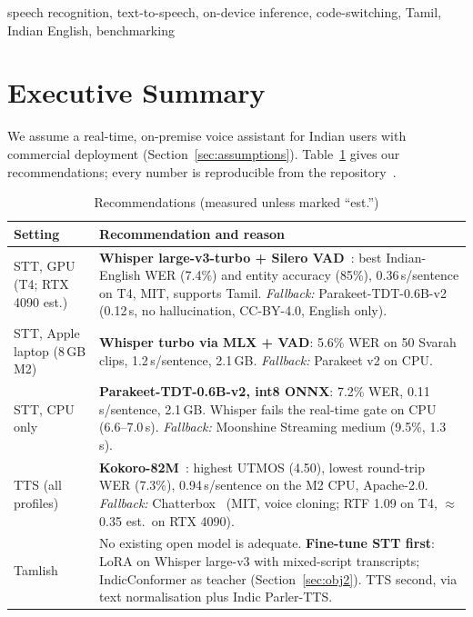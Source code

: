 \documentclass[conference]{IEEEtran}
\newcommand{\best}[1]{\textbf{#1}}
\begin{document}
\begin{IEEEkeywords}
speech recognition, text-to-speech, on-device inference, code-switching, Tamil, Indian English, benchmarking
\end{IEEEkeywords}

\section{Executive Summary}
\label{sec:summary}
We assume a real-time, on-premise voice assistant for Indian users with commercial deployment (Section~\ref{sec:assumptions}). Table~\ref{tab:recs} gives our recommendations; every number is reproducible from the repository~\cite{repo}.

\begin{table}[!t]
\caption{Recommendations (measured unless marked ``est.'')}
\label{tab:recs}
\footnotesize
\begin{tabularx}{\columnwidth}{@{}p{1.55cm}X@{}}
\toprule
\textbf{Setting} & \textbf{Recommendation and reason} \\
\midrule
STT, GPU (T4; RTX 4090 est.) & \best{Whisper large-v3-turbo + Silero VAD}~\cite{mc_whisperturbo,gh_silero}: best Indian-English WER (7.4\%) and entity accuracy (85\%), 0.36\,s/sentence on T4, MIT, supports Tamil. \textit{Fallback:} Parakeet-TDT-0.6B-v2~\cite{mc_parakeet} (0.12\,s, no hallucination, CC-BY-4.0, English only). \\
STT, Apple laptop (8\,GB M2) & \best{Whisper turbo via MLX + VAD}: 5.6\% WER on 50 Svarah clips, 1.2\,s/sentence, 2.1\,GB. \textit{Fallback:} Parakeet v2 on CPU. \\
STT, CPU only & \best{Parakeet-TDT-0.6B-v2, int8 ONNX}: 7.2\% WER, 0.11\,s/sentence, 2.1\,GB. Whisper fails the real-time gate on CPU (6.6--7.0\,s). \textit{Fallback:} Moonshine Streaming medium (9.5\%, 1.3\,s). \\
TTS (all profiles) & \best{Kokoro-82M}~\cite{mc_kokoro}: highest UTMOS (4.50), lowest round-trip WER (7.3\%), 0.94\,s/sentence on the M2 CPU, Apache-2.0. \textit{Fallback:} Chatterbox~\cite{chatterbox} (MIT, voice cloning; RTF 1.09 on T4, $\approx$0.35 est.\ on RTX 4090). \\
Tamlish & No existing open model is adequate. \best{Fine-tune STT first}: LoRA on Whisper large-v3 with mixed-script transcripts; IndicConformer as teacher (Section~\ref{sec:obj2}). TTS second, via text normalisation plus Indic Parler-TTS. \\
\bottomrule
\end{tabularx}
\end{table}
\end{document}
